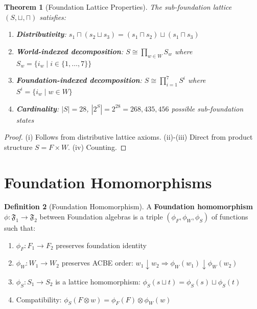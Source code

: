 \documentclass[11pt,twoside,openright]{book}
\theoremstyle{definition}
\newtheorem{definition}{Definition}[chapter]
\theoremstyle{plain}
\newtheorem{theorem}[definition]{Theorem}
\theoremstyle{remark}
\begin{document}
\begin{theorem}[Foundation Lattice Properties]
\label{thm:foundation-lattice}
The sub-foundation lattice $(S, \sqcup, \sqcap)$ satisfies:
\begin{enumerate}[label=(\roman*)]
  \item \textbf{Distributivity}: $s_1 \sqcap (s_2 \sqcup s_3) = (s_1 \sqcap s_2) \sqcup (s_1 \sqcap s_3)$
  \item \textbf{World-indexed decomposition}: $S \cong \prod_{w \in W} S_w$ where $S_w = \{i_w \mid i \in \{1,\ldots,7\}\}$
  \item \textbf{Foundation-indexed decomposition}: $S \cong \prod_{i=1}^{7} S^i$ where $S^i = \{i_w \mid w \in W\}$
  \item \textbf{Cardinality}: $|S| = 28$, $|2^S| = 2^{28} = 268,435,456$ possible sub-foundation states
\end{enumerate}
\end{theorem}

\begin{proof}
(i) Follows from distributive lattice axioms. (ii)-(iii) Direct from product structure $S = F \times W$. (iv) Counting.
\end{proof}

\section{Foundation Homomorphisms}
\label{sec:foundation-homomorphisms}

\begin{definition}[Foundation Homomorphism]
\label{def:foundation-homomorphism}
A \textbf{Foundation homomorphism} $\phi : \mathfrak{F}_1 \to \mathfrak{F}_2$ between Foundation algebras is a triple $(\phi_F, \phi_W, \phi_S)$ of functions such that:
\begin{enumerate}[label=(\roman*)]
  \item $\phi_F : F_1 \to F_2$ preserves foundation identity
  \item $\phi_W : W_1 \to W_2$ preserves ACBE order: $w_1 \downarrow w_2 \Rightarrow \phi_W(w_1) \downarrow \phi_W(w_2)$
  \item $\phi_S : S_1 \to S_2$ is a lattice homomorphism: $\phi_S(s \sqcup t) = \phi_S(s) \sqcup \phi_S(t)$
  \item Compatibility: $\phi_S(F \otimes w) = \phi_F(F) \otimes \phi_W(w)$
\end{enumerate}
\end{definition}
\end{document}
